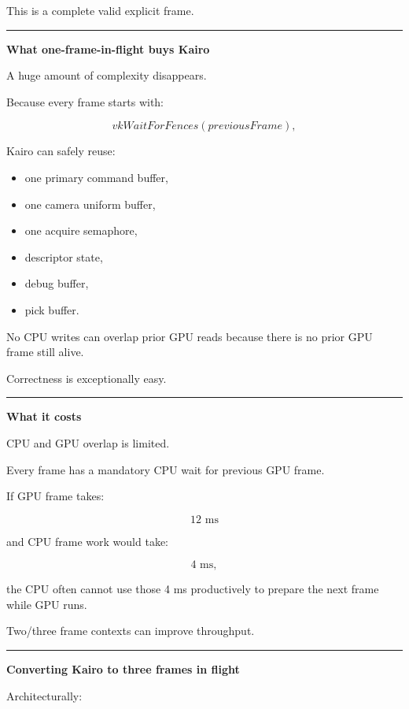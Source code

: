 This is a complete valid explicit frame.

\begin{center}\rule{0.5\linewidth}{0.5pt}\end{center}

\textbf{What one-frame-in-flight buys Kairo}

A huge amount of complexity disappears.

Because every frame starts with:

\[
vkWaitForFences(previousFrame),
\]

Kairo can safely reuse:

\begin{itemize}
\tightlist
\item
  one primary command buffer,
\item
  one camera uniform buffer,
\item
  one acquire semaphore,
\item
  descriptor state,
\item
  debug buffer,
\item
  pick buffer.
\end{itemize}

No CPU writes can overlap prior GPU reads because there is no prior GPU frame still alive.

Correctness is exceptionally easy.

\begin{center}\rule{0.5\linewidth}{0.5pt}\end{center}

\textbf{What it costs}

CPU and GPU overlap is limited.

Every frame has a mandatory CPU wait for previous GPU frame.

If GPU frame takes:

\[
12\text{ ms}
\]

and CPU frame work would take:

\[
4\text{ ms},
\]

the CPU often cannot use those 4 ms productively to prepare the next frame while GPU runs.

Two/three frame contexts can improve throughput.

\begin{center}\rule{0.5\linewidth}{0.5pt}\end{center}

\textbf{Converting Kairo to three frames in flight}

Architecturally:

